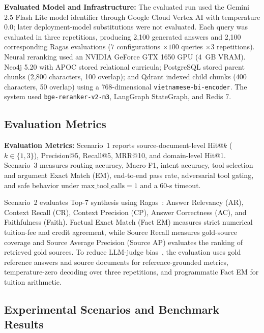 \noindent\textbf{Evaluated Model and Infrastructure:} The evaluated run used the Gemini 2.5 Flash Lite model identifier through Google Cloud Vertex AI with temperature 0.0; later deployment-model substitutions were not evaluated. Each query was evaluated in three repetitions, producing 2,100 generated answers and 2,100 corresponding Ragas evaluations ($7$ configurations $\times 100$ queries $\times 3$ repetitions). Neural reranking used an NVIDIA GeForce GTX 1650 GPU (4~GB VRAM). Neo4j 5.20 with APOC stored relational curricula; PostgreSQL stored parent chunks (2,800 characters, 100 overlap); and Qdrant indexed child chunks (400 characters, 50 overlap) using a 768-dimensional \texttt{vietnamese-bi-encoder}. The system used \texttt{bge-reranker-v2-m3}, LangGraph StateGraph, and Redis 7.

\subsection{Evaluation Metrics}
\label{sec:metrics}

\noindent\textbf{Evaluation Metrics:} Scenario~1 reports source-document-level Hit@$k$ ($k\in\{1,3\}$), Precision@5, Recall@5, MRR@10, and domain-level Hit@1. Scenario~3 measures routing accuracy, Macro-F1, intent accuracy, tool selection and argument Exact Match (EM), end-to-end pass rate, adversarial tool gating, and safe behavior under $\text{max\_tool\_calls}=1$ and a $60$-s timeout.

Scenario~2 evaluates Top-7 synthesis using Ragas~\cite{es2023ragas}: Answer Relevancy (AR), Context Recall (CR), Context Precision (CP), Answer Correctness (AC), and Faithfulness (Faith). Factual Exact Match (Fact EM) measures strict numerical tuition-fee and credit agreement, while Source Recall measures gold-source coverage and Source Average Precision (Source AP) evaluates the ranking of retrieved gold sources. To reduce LLM-judge bias~\cite{zheng2023judging,es2023ragas}, the evaluation uses gold reference answers and source documents for reference-grounded metrics, temperature-zero decoding over three repetitions, and programmatic Fact EM for tuition arithmetic.

\subsection{Experimental Scenarios and Benchmark Results}
\label{sec:scenarios}

